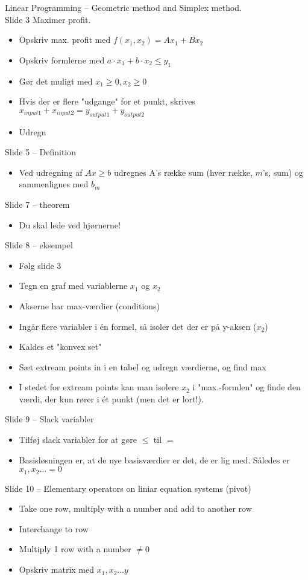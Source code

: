 \documentclass[10pt, a4]{Memoir}
\begin{document}
Linear Programming -- Geometric method and Simplex method.
\\
Slide 3
Maximer profit.
\begin{itemize}
\item Opskriv max. profit med $f(x_1, x_2) = Ax_1 + Bx_2$
\item Opskriv formlerne med $a \cdot x_1 + b \cdot x_2 \leq y_1$
\item Gør det muligt med $x_1 \geq 0, x_2 \geq 0$
\item Hvis der er flere "udgange" for et punkt, skrives $x_{input1}+x_{input2} = y_{output1}+y_{output2}$
\item Udregn
\end{itemize}
Slide 5 -- Definition
\begin{itemize}
\item Ved udregning af $Ax \geq b$ udregnes A's række sum (hver række, $m$'s, sum) og sammenlignes med $b_m$
\end{itemize}
Slide 7 -- theorem
\begin{itemize}
\item Du skal lede ved hjørnerne!
\end{itemize}
Slide 8 -- eksempel
\begin{itemize}
\item Følg slide 3
\item Tegn en graf med variablerne $x_1$ og $x_2$
\item Akserne har max-værdier (conditions)
\item Ingår flere variabler i én formel, så isoler det der er på y-aksen ($x_2$)
\item Kaldes et "konvex set"
\item Sæt extream points in i en tabel og udregn værdierne, og find max
\item I stedet for extream points kan man isolere $x_2$ i "max.-formlen" og finde den værdi, der kun rører i ét punkt (men det er lort!).
\end{itemize}
Slide 9 -- Slack variabler
\begin{itemize}
\item Tilføj slack variabler for at gøre $\leq$ til $=$
\item Basisløsningen er, at de nye basisværdier er det, de er lig med. Således er $x_1, x_2 \ldots = 0$
\end{itemize}
Slide 10 -- Elementary operators on liniar equation systems (pivot)
\begin{itemize}
\item Take one row, multiply with a number and add to another row
\item Interchange to row
\item Multiply 1 row with a number $\not = 0$
\item Opskriv matrix med $x_1, x_2 \ldots y$
\end{itemize}
\end{document}

